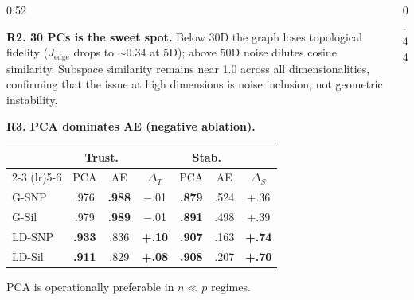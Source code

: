 \documentclass[final]{beamer}
\begin{document}
\begin{frame}[t]
\begin{columns}[T,totalwidth=\textwidth]
\begin{column}{0.52\textwidth}
\begin{minipage}[t]{\linewidth}
\begin{minipage}[t]{0.45\linewidth}
{\vspace{1.2mm}
\textbf{R2. 30 PCs is the sweet spot.}
Below 30D the graph loses topological fidelity
($J_{\text{edge}}$ drops to ${\sim}$0.34 at 5D);
above 50D noise dilutes cosine similarity.
Subspace similarity remains near 1.0 across all
dimensionalities, confirming that the issue at high
dimensions is noise inclusion, not geometric instability.

\vspace{1.2mm}
\textbf{R3. PCA dominates AE (negative ablation).}}

\vspace{0.8mm}
{\scriptsize
\begin{tabular}{@{} l cc c cc c @{}}
    \toprule
    & \multicolumn{2}{c}{\textbf{Trust.}} & & \multicolumn{2}{c}{\textbf{Stab.}} & \\
    \cmidrule(lr){2-3} \cmidrule(lr){5-6}
    & PCA & AE & $\Delta_T$ & PCA & AE & $\Delta_S$ \\
    \midrule
    \textcolor{okblue}{G-SNP}   & .976 & \textbf{.988} & {\color{darktext!50}$-$.01} & \textbf{.879} & .524 & +.36 \\
    \textcolor{okteal}{G-Sil}   & .979 & \textbf{.989} & {\color{darktext!50}$-$.01} & \textbf{.891} & .498 & +.39 \\
    \textcolor{okverm}{LD-SNP}  & \textbf{.933} & .836 & \textcolor{okverm}{\textbf{+.10}} & \textbf{.907} & .163 & \textcolor{okverm}{\textbf{+.74}} \\
    \textcolor{okrose}{LD-Sil}  & \textbf{.911} & .829 & \textcolor{okrose}{\textbf{+.08}} & \textbf{.908} & .207 & \textcolor{okrose}{\textbf{+.70}} \\
    \bottomrule
\end{tabular}}

\vspace{0.8mm}
{\small PCA is operationally preferable in $n \ll p$ regimes.}
\end{minipage}

\end{minipage}
\end{column}

\begin{column}{0.44\textwidth}
\begin{minipage}[t]{\linewidth}
\vspace{0pt}


\end{minipage}
\end{column}
\end{columns}
\end{frame}
\end{document}
